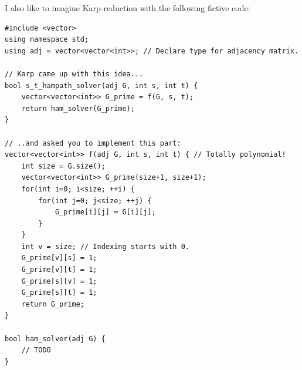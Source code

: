 I also like to imagine Karp-reduction with the following fictive code:

\begin{verbatim}
#include <vector>
using namespace std;
using adj = vector<vector<int>>; // Declare type for adjacency matrix.

// Karp came up with this idea...
bool s_t_hampath_solver(adj G, int s, int t) {
    vector<vector<int>> G_prime = f(G, s, t);
    return ham_solver(G_prime);
}

// ..and asked you to implement this part:
vector<vector<int>> f(adj G, int s, int t) { // Totally polynomial!
    int size = G.size();
    vector<vector<int>> G_prime(size+1, size+1);
    for(int i=0; i<size; ++i) {
        for(int j=0; j<size; ++j) {
            G_prime[i][j] = G[i][j];
        }
    }
    int v = size; // Indexing starts with 0.
    G_prime[v][s] = 1;
    G_prime[v][t] = 1;
    G_prime[s][v] = 1;
    G_prime[s][t] = 1;
    return G_prime;
}

bool ham_solver(adj G) {
    // TODO
}
\end{verbatim}